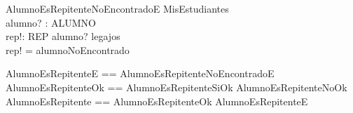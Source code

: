 \begin{schema}{AlumnoEsRepitenteNoEncontradoE}
    \Xi MisEstudiantes \\
    alumno? : ALUMNO \\
    rep!: REP
    \where
    alumno? \notin \dom legajos \\
    rep! = alumnoNoEncontrado
\end{schema}

\begin{zed}
    AlumnoEsRepitenteE == AlumnoEsRepitenteNoEncontradoE \\
    AlumnoEsRepitenteOk == AlumnoEsRepitenteSiOk \lor AlumnoEsRepitenteNoOk \\
    AlumnoEsRepitente == AlumnoEsRepitenteOk \lor AlumnoEsRepitenteE \\
\end{zed}
